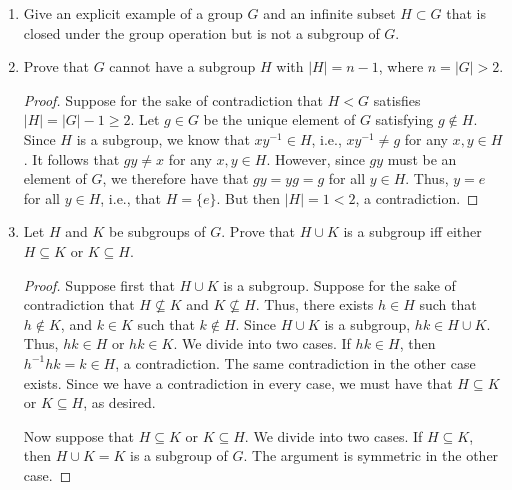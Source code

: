 \documentclass[../notes.tex]{subfiles}
\begin{document}
\begin{enumerate}[label={\textbf{\arabic*.}}]
\begin{enumerate}[label={\textbf{(\alph*)}}]
        \item For fixed $n\in\Z^+$, the set of rational numbers whose denominators are relatively prime to $n$ (under addition).
        \begin{proof}
            Symmetric to part (c) --- the lcm of two numbers coprime to $n$ will not contain any factors of $n$.
        \end{proof}
        \item The set of nonzero real numbers whose square is a rational number (under multiplication).
        \begin{proof}
            Let $H=\{x\in\R\mid x^2\in\Q\}$.\par
            Criterion 1: Let $x=\sqrt{2}$. Then $x^2=2\in\Q$, so $x\in H$, i.e., $H\neq\emptyset$, as desired.\par
            Criterion 2: Let $x,y\in H$ be arbitrary. Since $x^2,y^{-2}\in\Q$, it follows that $x^2y^{-2}=(xy^{-1})^2\in\Q$. Therefore, $xy^{-1}\in H$, as desired.
        \end{proof}
    \end{enumerate}
    \setcounter{enumi}{3}
    \item Give an explicit example of a group $G$ and an infinite subset $H\subset G$ that is closed under the group operation but is not a subgroup of $G$.
    \item Prove that $G$ cannot have a subgroup $H$ with $|H|=n-1$, where $n=|G|>2$.
    \begin{proof}
        Suppose for the sake of contradiction that $H<G$ satisfies $|H|=|G|-1\geq 2$. Let $g\in G$ be the unique element of $G$ satisfying $g\notin H$. Since $H$ is a subgroup, we know that $xy^{-1}\in H$, i.e., $xy^{-1}\neq g$ for any $x,y\in H$. It follows that $gy\neq x$ for any $x,y\in H$. However, since $gy$ must be an element of $G$, we therefore have that $gy=yg=g$ for all $y\in H$. Thus, $y=e$ for all $y\in H$, i.e., that $H=\{e\}$. But then $|H|=1<2$, a contradiction.
    \end{proof}
    \setcounter{enumi}{7}
    \item Let $H$ and $K$ be subgroups of $G$. Prove that $H\cup K$ is a subgroup iff either $H\subseteq K$ or $K\subseteq H$.
    \begin{proof}
        Suppose first that $H\cup K$ is a subgroup. Suppose for the sake of contradiction that $H\not\subseteq K$ and $K\not\subseteq H$. Thus, there exists $h\in H$ such that $h\notin K$, and $k\in K$ such that $k\notin H$. Since $H\cup K$ is a subgroup, $hk\in H\cup K$. Thus, $hk\in H$ or $hk\in K$. We divide into two cases. If $hk\in H$, then $h^{-1}hk=k\in H$, a contradiction. The same contradiction in the other case exists. Since we have a contradiction in every case, we must have that $H\subseteq K$ or $K\subseteq H$, as desired.\par
        Now suppose that $H\subseteq K$ or $K\subseteq H$. We divide into two cases. If $H\subseteq K$, then $H\cup K=K$ is a subgroup of $G$. The argument is symmetric in the other case.
    \end{proof}
\end{enumerate}
\end{document}
